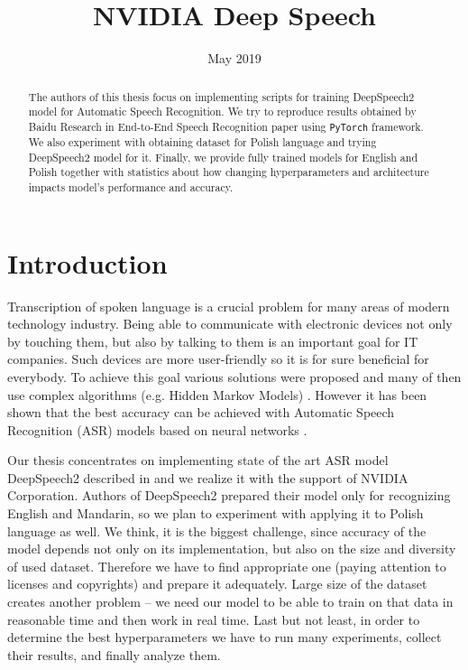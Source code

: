 \documentclass[licencjacka,en]{pracamgr}
\title{NVIDIA Deep Speech}
\date{May 2019}
\begin{document}
\maketitle

\begin{abstract}
  The authors of this thesis focus on implementing scripts for training DeepSpeech2 model for Automatic Speech Recognition. We try to reproduce results obtained by Baidu Research in End-to-End Speech Recognition paper \cite{DS2} using \texttt{PyTorch} framework. We also experiment with obtaining dataset for Polish language and trying DeepSpeech2 model for it. Finally, we provide fully trained models for English and Polish together with statistics about how changing hyperparameters and architecture impacts model's performance and accuracy.
\end{abstract}

\tableofcontents

\chapter*{Introduction}
Transcription of spoken language is a crucial problem for many areas of modern technology industry. Being able to communicate with electronic devices not only by touching them, but also by talking to them is an important goal for IT companies. Such devices are more user-friendly so it is for sure beneficial for everybody. To achieve this goal various solutions were proposed and many of then use complex algorithms (e.g. Hidden Markov Models) \cite{DS1}. However it has been shown that the best accuracy can be achieved with Automatic Speech Recognition (ASR) models based on neural networks \cite{DS2}.

Our thesis concentrates on implementing state of the art ASR model DeepSpeech2 described in \cite{DS2} and we realize it with the support of NVIDIA Corporation. Authors of DeepSpeech2 prepared their model only for recognizing English and Mandarin, so we plan to experiment with applying it to Polish language as well. We think, it is the biggest challenge, since accuracy of the model depends not only on its implementation, but also on the size and diversity of used dataset. Therefore we have to find appropriate one (paying attention to licenses and copyrights) and prepare it adequately. Large size of the dataset creates another problem -- we need our model to be able to train on that data in reasonable time and then work in real time. Last but not least, in order to determine the best hyperparameters we have to run many experiments, collect their results, and finally analyze them.
\end{document}
